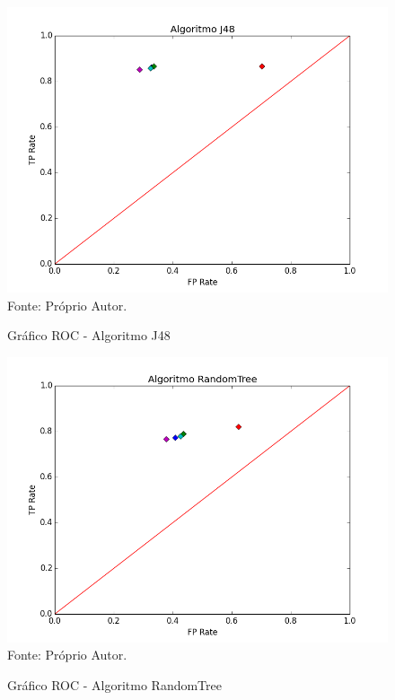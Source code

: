 \documentclass[
	12pt,				%
	openright,			%
	oneside,	
	a4paper,				%
	english,				%
	brazil				%
]{abntex2/abntex2} %
\begin{document}
	\pagebreak
	\clearpage
	\newpage
	
	
	\begin{figure}[!htb]
		\caption{\label{figRocJ48} Gráfico ROC - Algoritmo J48}
		\begin{center}
			\includegraphics[scale=0.8]{python/j48.png}
			Fonte: Próprio Autor.
		\end{center}
	\end{figure}
	
	\begin{figure}[!htb]
		\caption{\label{figRocRandomTree} Gráfico ROC - Algoritmo RandomTree}
		\begin{center}
			\includegraphics[scale=0.8]{python/RandomTree.png}
			Fonte: Próprio Autor.
		\end{center}
	\end{figure}
	
\end{document}
